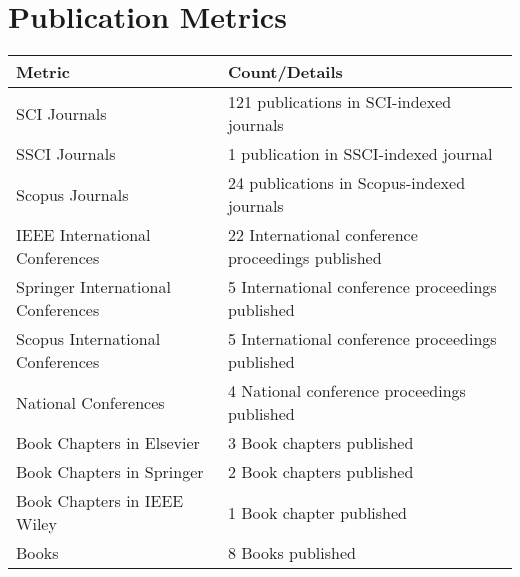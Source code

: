 \documentclass[11pt,a4paper]{moderncv}
\begin{document}
\vspace{1cm}

\section{\textbf{Publication Metrics}}

\begin{adjustwidth}{6em}{0pt}
\begin{center}
\begin{tabular}{p{7cm}p{9cm}}
	
	\hline
	\textbf{Metric} & \textbf{Count/Details} \\
	\hline
	SCI Journals& 121 publications in SCI-indexed journals \\
	SSCI Journals& 1 publication in SSCI-indexed journal \\
	Scopus Journals& 24 publications in Scopus-indexed journals \\
	IEEE International Conferences & 22 International conference proceedings published \\
	Springer International Conferences  & 5 International conference proceedings published \\
	Scopus International Conferences  & 5 International conference proceedings published \\
	National Conferences  & 4 National conference proceedings published \\
	Book Chapters in Elsevier & 3 Book chapters published \\
	Book Chapters in Springer & 2 Book chapters published \\
	Book Chapters in IEEE Wiley & 1 Book chapter published \\
	Books & 8 Books published \\
	\hline
\end{tabular}
\end{center}
\end{adjustwidth}
\end{document}
